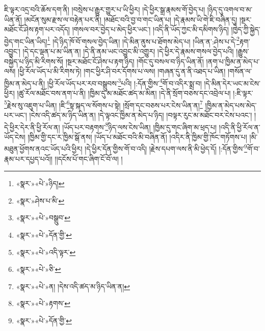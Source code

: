 ཇི་ལྟར་འདྲ་བའི་ཆོས་དག་ནི། །བསྲེས་པ་རྒྱུར་གྱུར་པ་ཡི་ཕྱིར། །དེ་ཕྱིར་སྒྲ་རྣམས་གོ་བྱེད་པ། །ཉིད་དུ་འགལ་བ་མ་ཡིན་ནོ། །མངོན་སུམ་རྫས་ལ་བརྟེན་པར་ནི། །མཐོང་བའི་བྱ་བ་གང་ཡིན་པ། །དེ་རྣམས་ཡི་གེ་ཇི་བཞིན་དུ། །སྔར་མཐོང་ངོ་ཤེས་རྟག་པར་འདོད། །གསལ་བར་བྱེད་པ་མེད་ཕྱིར་ཡང་། །འདི་ནི་ཡོད་ཀྱང་མི་དམིགས་ཉིད། །ཁྱེད་ཀྱི་སྐྱེད་བྱེད་གང་ཡིན་ཡིད།\footnote{«སྣར་»«པེ་»ཉིད།} །དེ་ཉིད་ཁོ་བོ་གསལ་བྱེད་ཡིན། །དེ་མིན་ནུས་པ་ཐོགས་མེད་པ། །ཡིན་ན་:ཤེས་པ་དེ་\footnote{«སྣར་»ཤེས་པ་མི་}རྟག་འབྱུང་། །དེ་དང་ལྡན་པ་མ་ཡིན་ན། །དེ་ནི་ནམ་ཡང་འབྱུང་མི་འགྱུར། །དེ་ཕྱིར་དེ་རྣམས་གསལ་བྱེད་པའི། །རྒྱུས་བསྐྱེད་པ་ཉིད་མི་རིགས་སོ། །སྔར་མཐོང་ངོ་ཤེས་པ་རྟག་ཉིད། །གོང་དུ་བསལ་བ་ཉིད་ཡིན་ནོ། །ནག་པ་ཁྱིམ་ན་མེད་པ་ལས། །ཕྱི་རོལ་ཡོད་པ་མི་རིགས་ཏེ། །གང་ཕྱིར་ཤི་བར་དོགས་པ་ལས། །གཞན་དུ་ན་ནི་འཐད་པ་ཡིན། །གསོན་ལ་ཁྱིམ་ན་མེད་པ་ནི། །ཕྱི་རོལ་ཡོད་པར་རབ་བསྒྲུབས་\footnote{«སྣར་»«པེ་»བསྒྲུབ་}པའི། །:དོན་གྱིས་\footnote{«སྣར་»«པེ་»དོན་གྱི་}གོ་བ་འདིར་སྨྲ་བ། །དེ་མིན་དེར་ཡང་མ་ངེས་ཕྱིར། །ཚུ་རོལ་མཐོང་བས་ནག་པ་ནི། །ཁྱིམ་དུ་མ་མཐོང་ཚད་མ་མིན། །དེ་ནི་སྲོག་བཅས་དང་འབྲེལ་པ། །:ཇི་ལྟར་\footnote{«སྣར་»«པེ་»འདི་ལྟར་}རྗེས་སུ་འཇུག་པ་ཡིན། །ཇི་\footnote{«སྣར་»«པེ་»ཅི་}སྟ་སྐད་ལ་སོགས་པ་སྟེ། །སྲོག་དང་བཅས་པར་ངེས་ཡིན་ན།\footnote{«སྣར་»«པེ་»ན། །དེས་འདི་ཚད་མ་ཉིད་ཡིན་ན།} །ཁྱིམ་ན་མེད་པས་མེད་པར་ཡང་། །ངེས་འདི་ཚད་མ་ཉིད་ཡིན་ན། །དེ་ལྟའང་ཁྱིམ་ན་མེད་པ་ཉིད། །བལྟར་རུང་མ་མཐོང་བར་ངེས་པའང་། །དེ་ཕྱིར་དེར་ནི་ཕྱི་རོལ་ན། །ཡོད་པར་བརྟགས་\footnote{«སྣར་»«པེ་»རྟགས་}ཉིད་ལས་ངེས་ཡིན། །ཁྱིམ་དུ་གང་ཞིག་མ་ཕྲད་པ། །འདི་ནི་ཕྱི་རོལ་ན་ཡོད་ངེས། །ཁྱིམ་གྱི་དང་ར་ཁྱིམ་སྒོ་ནས། །ཡོད་པ་མཐོང་བའི་མི་བཞིན་ནོ། །འདིར་ནི་ཁྱིམ་གྱི་ཁོང་གཏོགས་པ། །མི་མཐུན་ཕྱོགས་ནའང་ཡོད་པའི་ཕྱིར། །དེ་ཕྱིར་དོན་གྱིས་གོ་བ་འདི། །རྗེས་དཔག་ལས་ནི་མི་ཕྱེད་དོ། །:དོན་གྱིས་\footnote{«སྣར་»«པེ་»དོན་གྱི་}གོ་བ་རྣམ་པར་དཔྱད་པའོ།། །།དངོས་པོ་གང་ཞིག་ངོ་བོ་ལ། །
